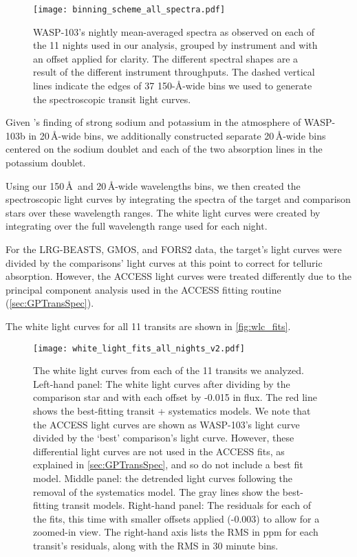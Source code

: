 \documentclass[twocolumn]{aastex63}
\begin{document}
\begin{figure}
\centering
\texttt{[image: binning\_scheme\_all\_spectra.pdf]}
\caption{WASP-103's nightly mean-averaged spectra as observed on each of the 11 nights used in our analysis, grouped by instrument and with an offset applied for clarity. The different spectral shapes are a result of the different instrument throughputs. The dashed vertical lines indicate the edges of 37 150-\AA-wide bins we used to generate the spectroscopic transit light curves.}
\label{fig:stellar_spectra}
\end{figure}

Given \cite{Lendl2017}'s finding of strong sodium and potassium in the atmosphere of WASP-103b in 20\,\AA-wide bins, we additionally constructed separate 20\,\AA-wide bins centered on the sodium doublet and each of the two absorption lines in the potassium doublet.

Using our 150\,\AA\ and 20\,\AA-wide wavelengths bins, we then created the spectroscopic light curves by integrating the spectra of the target and comparison stars over these wavelength ranges. The white light curves were created by integrating over the full wavelength range used for each night. 

For the LRG-BEASTS, GMOS, and FORS2 data, the target's light curves were divided by the comparisons' light curves at this point to correct for telluric absorption. However, the ACCESS light curves were treated differently due to the principal component analysis used in the ACCESS fitting routine (\autoref{sec:GPTransSpec}).

The white light curves for all 11 transits are shown in \autoref{fig:wlc_fits}.

\begin{figure*}
    \centering
    \texttt{[image: white\_light\_fits\_all\_nights\_v2.pdf]}
    \caption{The white light curves from each of the 11 transits we analyzed. Left-hand panel: The white light curves after dividing by the comparison star and with each offset by -0.015 in flux. The red line shows the best-fitting transit + systematics models. We note that the ACCESS light curves are shown as WASP-103's light curve divided by the `best' comparison's light curve. However, these differential light curves are not used in the ACCESS fits, as explained in \autoref{sec:GPTransSpec}, and so do not include a best fit model. Middle panel: the detrended light curves following the removal of the systematics model. The gray lines show the best-fitting transit models. Right-hand panel: The residuals for each of the fits, this time with smaller offsets applied (-0.003) to allow for a zoomed-in view. The right-hand axis lists the RMS in ppm for each transit's residuals, along with the RMS in 30 minute bins.}
    \label{fig:wlc_fits}
\end{figure*}
\end{document}
